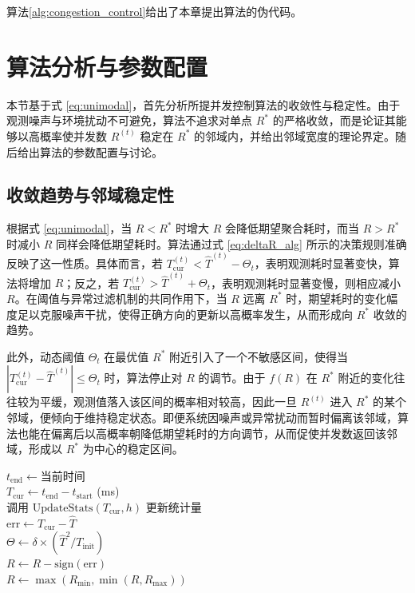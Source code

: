 \documentclass[master, vlined]{DissertUESTC}
\begin{document}
	算法\ref{alg:congestion_control}给出了本章提出算法的伪代码。

	\section{算法分析与参数配置}
	\label{sec:analysis}

	本节基于式 \eqref{eq:unimodal}，首先分析所提并发控制算法的收敛性与稳定性。由于观测噪声与环境扰动不可避免，算法不追求对单点 $R^*$ 的严格收敛，而是论证其能够以高概率使并发数 $R^{(t)}$ 稳定在 $R^*$ 的邻域内，并给出邻域宽度的理论界定。随后给出算法的参数配置与讨论。

	\subsection{收敛趋势与邻域稳定性}

	根据式 \eqref{eq:unimodal}，当 $R < R^*$ 时增大 $R$ 会降低期望聚合耗时，而当 $R > R^*$ 时减小 $R$ 同样会降低期望耗时。算法通过式 \eqref{eq:deltaR_alg} 所示的决策规则准确反映了这一性质。具体而言，若 $T_{\mathrm{cur}}^{(t)} < \hat{T}^{(t)} - \Theta_t$，表明观测耗时显著变快，算法将增加 $R$；反之，若 $T_{\mathrm{cur}}^{(t)} > \hat{T}^{(t)} + \Theta_t$，表明观测耗时显著变慢，则相应减小 $R$。在阈值与异常过滤机制的共同作用下，当 $R$ 远离 $R^*$ 时，期望耗时的变化幅度足以克服噪声干扰，使得正确方向的更新以高概率发生，从而形成向 $R^*$ 收敛的趋势。

	此外，动态阈值 $\Theta_t$ 在最优值 $R^*$ 附近引入了一个不敏感区间，使得当 $|T_{\mathrm{cur}}^{(t)} - \hat{T}^{(t)}| \le \Theta_t$ 时，算法停止对 $R$ 的调节。由于 $f(R)$ 在 $R^*$ 附近的变化往往较为平缓，观测值落入该区间的概率相对较高，因此一旦 $R^{(t)}$ 进入 $R^*$ 的某个邻域，便倾向于维持稳定状态。即便系统因噪声或异常扰动而暂时偏离该邻域，算法也能在偏离后以高概率朝降低期望耗时的方向调节，从而促使并发数返回该邻域，形成以 $R^*$ 为中心的稳定区间。

	\begin{algorithm}[!htb]
		\caption{流量并发控制算法}
		\label{alg:congestion_control}
		\BlankLine
		$t_{\text{end}} \leftarrow \text{当前时间}$ \\
		$T_{\text{cur}} \leftarrow t_{\text{end}} - t_{\text{start}}$ (ms) \\
		调用 $\text{UpdateStats}(T_{\text{cur}}, h)$ 更新统计量 \\
		$\text{err} \leftarrow T_{\text{cur}} - \hat{T}$ \\
		$\Theta \leftarrow \delta \times (\hat{T}^2 / T_{\text{init}})$ \\
		$R \leftarrow R - \text{sign}(\text{err})$  \\
		$R \leftarrow \max(R_{\min}, \min(R, R_{\max}))$
	\end{algorithm}
\end{document}
